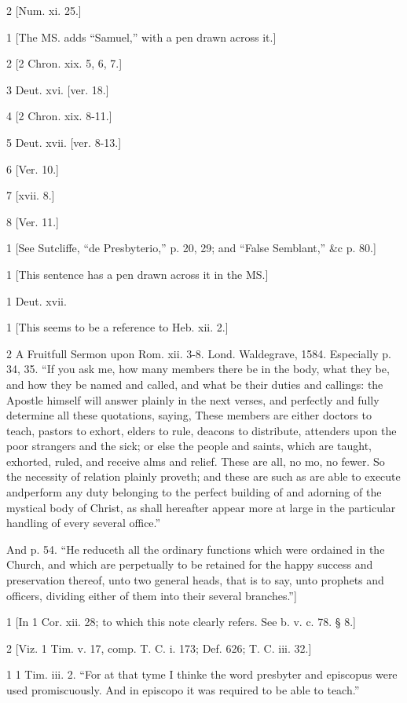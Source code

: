 2
[Num. xi. 25.]

1
[The MS. adds “Samuel,” with a pen drawn across it.]

2
[2 Chron. xix. 5, 6, 7.]

3
Deut. xvi. [ver. 18.]

4
[2 Chron. xix. 8-11.]

5
Deut. xvii. [ver. 8-13.]

6
[Ver. 10.]

7
[xvii. 8.]

8
[Ver. 11.]

1
[See Sutcliffe, “de Presbyterio,” p. 20, 29; and “False Semblant,” &c p. 80.]

1
[This sentence has a pen drawn across it in the MS.]

1
Deut. xvii.

1
[This seems to be a reference to Heb. xii. 2.]

2
A Fruitfull Sermon upon Rom. xii. 3-8. Lond. Waldegrave, 1584. Especially p. 34, 35. “If you ask me, how many members there be in the body, what they be, and how they be named and called, and what be their duties and callings: the Apostle himself will answer plainly in the next verses, and perfectly and fully determine all these quotations, saying, These members are either doctors to teach, pastors to exhort, elders to rule, deacons to distribute, attenders upon the poor strangers and the sick; or else the people and saints, which are taught, exhorted, ruled, and receive alms and relief. These are all, no mo, no fewer. So the necessity of relation plainly proveth; and these are such as are able to execute andperform any duty belonging to the perfect building of and adorning of the mystical body of Christ, as shall hereafter appear more at large in the particular handling of every several office.”

And p. 54. “He reduceth all the ordinary functions which were ordained in the Church, and which are perpetually to be retained for the happy success and preservation thereof, unto two general heads, that is to say, unto prophets and officers, dividing either of them into their several branches.”]

1
[In 1 Cor. xii. 28; to which this note clearly refers. See b. v. c. 78. § 8.]

2
[Viz. 1 Tim. v. 17, comp. T. C. i. 173; Def. 626; T. C. iii. 32.]

1
1 Tim. iii. 2. “For at that tyme I thinke the word presbyter and episcopus were used promiscuously. And in episcopo it was required to be able to teach.”

